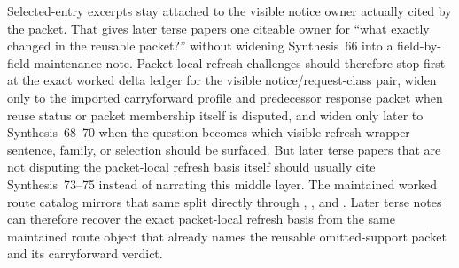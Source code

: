 \documentclass[11pt]{article}
\begin{document}
Selected-entry excerpts stay attached to the visible notice owner actually cited by the packet. That gives later terse papers one citeable owner for ``what exactly changed in the reusable packet?'' without widening Synthesis~66 into a field-by-field maintenance note. Packet-local refresh challenges should therefore stop first at the exact worked delta ledger for the visible notice/request-class pair, widen only to the imported carryforward profile and predecessor response packet when reuse status or packet membership itself is disputed, and widen only later to Synthesis~68--70 when the question becomes which visible refresh wrapper sentence, family, or selection should be surfaced. But later terse papers that are not disputing the packet-local refresh basis itself should usually cite Synthesis~73--75 instead of narrating this middle layer. The maintained worked route catalog mirrors that same split directly through , , and . Later terse notes can therefore recover the exact packet-local refresh basis from the same maintained route object that already names the reusable omitted-support packet and its carryforward verdict.
\end{document}
